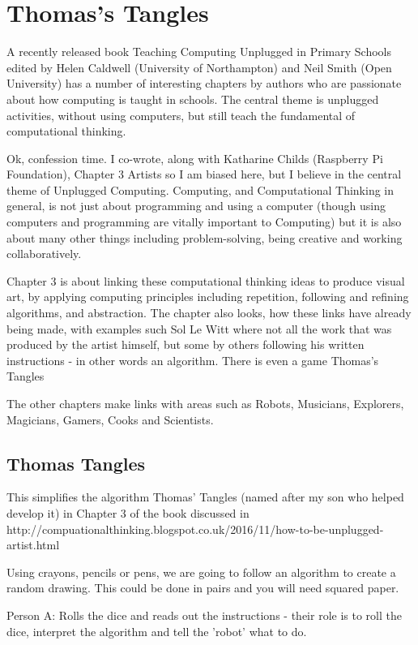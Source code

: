 
\chapter{Thomas's Tangles}
A recently released book Teaching Computing Unplugged in Primary Schools  edited by Helen Caldwell (University of Northampton) and Neil Smith (Open University) has a number of interesting chapters by authors who are passionate about how computing is taught in schools. The central theme is unplugged activities, without using computers, but still teach the fundamental of computational thinking.

Ok, confession time. I co-wrote, along with Katharine Childs (Raspberry Pi Foundation), Chapter 3 Artists so I am biased here, but I believe in the central theme of Unplugged Computing. Computing, and Computational Thinking in general,  is not just about programming and using a computer (though using computers and  programming are vitally important to Computing) but it is also about many other things including problem-solving, being creative and working collaboratively.

Chapter 3 is about linking these computational thinking ideas to produce visual art, by applying computing principles including  repetition, following and refining algorithms, and abstraction. The chapter also looks, how these links have already being made, with examples such Sol Le Witt where not all the work that was produced by the artist himself, but some by others following his written instructions - in other words an algorithm. There is even a game Thomas's Tangles

The other chapters make links with areas such as Robots, Musicians, Explorers, Magicians, Gamers, Cooks and Scientists.

\section{Thomas Tangles}
This simplifies the algorithm Thomas' Tangles (named after my son who helped develop it) in Chapter 3 of the book discussed in http://compuationalthinking.blogspot.co.uk/2016/11/how-to-be-unplugged-artist.html

Using crayons, pencils or pens, we are going to follow an algorithm to create a random drawing. This could be done in pairs and you will need squared paper. 

Person A: Rolls the dice and reads out the instructions - their role is to roll the dice, interpret the algorithm and tell the 'robot' what to do.

